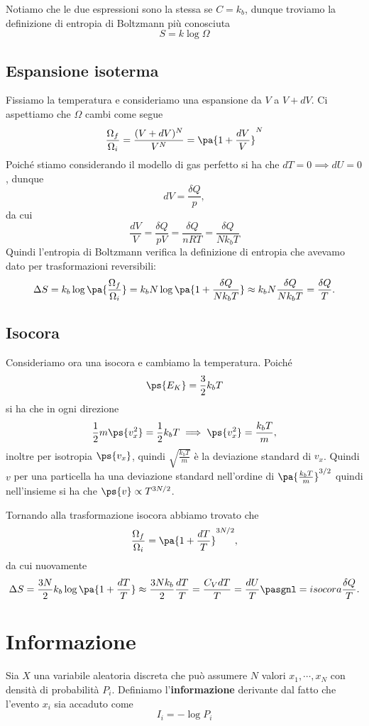 \noindent Notiamo che le due espressioni sono la stessa se $C=k_b$, dunque troviamo la definizione di entropia di Boltzmann pi\`u conosciuta
\[\boxed{S=k\log \Omega}\]

\subsection{Espansione isoterma}
Fissiamo la temperatura e consideriamo una espansione da $V$ a $V+dV$. Ci aspettiamo che $\Omega$ cambi come segue
\[\frac{\Omega_f}{\Omega_i}=\frac{(V+dV)^N}{V^N}=\pa{1+\frac{dV}V}^N\]
Poich\'e stiamo considerando il modello di gas perfetto si ha che $dT=0\implies dU=0$, dunque
\[dV=\frac{\delta Q}p,\]
da cui
\[\frac{dV}V=\frac{\delta Q}{pV}=\frac{\delta Q}{nRT}=\frac{\delta Q}{Nk_b T}\]
Quindi l'entropia di Boltzmann verifica la definizione di entropia che avevamo dato per trasformazioni reversibili:
\[\Delta S=k_b\log\pa{\frac{\Omega_f}{\Omega_i}}=k_b N\log\pa{1+\frac{\delta Q}{Nk_b T}}\approx k_bN\frac{\delta Q}{Nk_bT}=\frac{\delta Q}T.\]

\subsection{Isocora}
Consideriamo ora una isocora e cambiamo la temperatura. Poich\'e
\[\ps{E_K}=\frac32k_bT\]
si ha che in ogni direzione 
\[\frac12m\ps{v_x^2}=\frac12 k_bT\implies \ps{v_x^2}=\frac{k_bT}m,\]
inoltre per isotropia $\ps{v_x}$, quindi $\sqrt{\frac{k_bT}m}$ \`e la deviazione standard di $v_x$.
Quindi $v$ per una particella ha una deviazione standard nell'ordine di $\pa{\frac{k_bT}m}^{3/2}$ quindi nell'insieme si ha che $\ps{v}\propto T^{3N/2}$.
\medskip

\noindent
Tornando alla trasformazione isocora abbiamo trovato che 
\[\frac{\Omega_f}{\Omega_i}=\pa{1+\frac{dT}T}^{3N/2},\]
da cui nuovamente
\[\Delta S=\frac{3N}2k_b\log\pa{1+\frac{dT}T}\approx \frac{3Nk_b}2\frac{dT}T=\frac{C_VdT}T=\frac{dU}T\pasgnl={isocora}\frac{\delta Q}T.\]



\section{Informazione}
\begin{definition}[Informazione]
Sia $X$ una variabile aleatoria discreta che pu\`o assumere $N$ valori $x_1,\cdots, x_N$ con densit\`a di probabilit\`a $P_i$. 
Definiamo l'\textbf{informazione} derivante dal fatto che l'evento $x_i$ sia accaduto come
\[I_i=-\log P_i\]
\end{definition}

